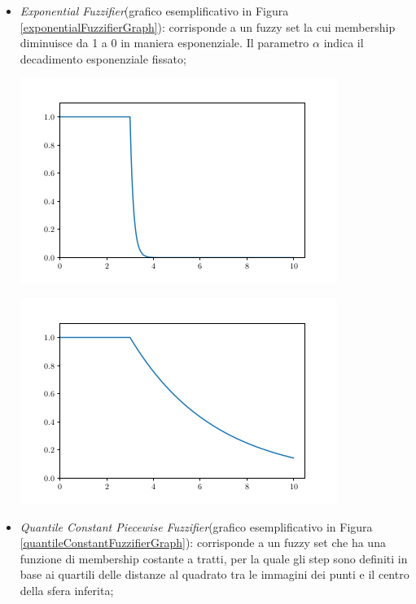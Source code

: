 \documentclass[12pt,a4paper]{report}
\begin{document}
\begin{itemize}
\item \emph{Exponential Fuzzifier}(grafico esemplificativo in Figura \ref{exponentialFuzzifierGraph}): corrisponde a un fuzzy set la cui  membership diminuisce da 1 a 0 in maniera esponenziale. Il parametro $\alpha$ indica il decadimento esponenziale fissato;

\begin{minipage}{\linewidth}
	\centering
       \includegraphics[width=0.8\linewidth]{images/exponentialFuzzifier.png}
	 \label{exponentialFuzzifierGraph}
\end{minipage}

\begin{minipage}{\linewidth}
	\centering
       \includegraphics[width=0.8\linewidth]{images/exponentialFuzzifier2.png}
\end{minipage}

\item \emph{Quantile Constant Piecewise Fuzzifier}(grafico esemplificativo in Figura \ref{quantileConstantFuzzifierGraph}):  corrisponde a un fuzzy set che ha una funzione di membership costante a tratti, per la quale gli step sono definiti in base ai quartili delle distanze al quadrato tra le immagini dei punti e il centro della sfera inferita; 


\end{itemize}
\end{document}
